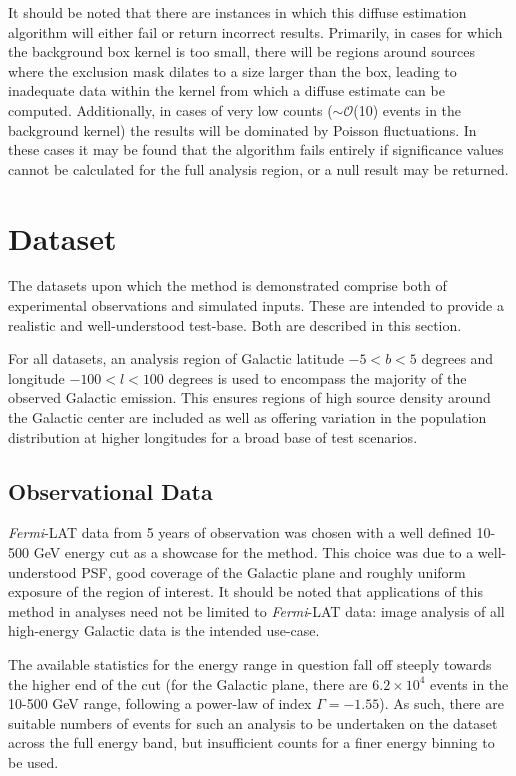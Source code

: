 \documentclass{PoS}
\begin{document}
It should be noted that there are instances in which this diffuse estimation algorithm will either fail or return incorrect results. Primarily, in cases for which the background box kernel is too small, there will be regions around sources where the exclusion mask dilates to a size larger than the box, leading to inadequate data within the kernel from which a diffuse estimate can be computed. Additionally, in cases of very low counts (\textbf{$\sim\mathcal{O}$}(10) events in the background kernel) the results will be dominated by Poisson fluctuations. In these cases it may be found that the algorithm fails entirely if significance values cannot be calculated for the full analysis region, or a null result may be returned.

\section{Dataset}

The datasets upon which the method is demonstrated comprise both of experimental observations and simulated inputs. These are intended to provide a realistic and well-understood test-base. Both are described in this section.

For all datasets, an analysis region of Galactic latitude $-5 < b < 5$ degrees and longitude $-100 < l < 100$ degrees is used to encompass the majority of the observed Galactic emission. This ensures regions of high source density around the Galactic center are included as well as offering variation in the population distribution at higher longitudes for a broad base of test scenarios.


\subsection{Observational Data}

\textit{Fermi}-LAT data from 5 years of observation was chosen with a well defined 10-500 GeV energy cut as a showcase for the method. This choice was due to a well-understood PSF, good coverage of the Galactic plane and roughly uniform exposure of the region of interest. It should be noted that applications of this method in analyses need not be limited to \textit{Fermi}-LAT data: image analysis of all high-energy Galactic data is the intended use-case.

The available statistics for the energy range in question fall off steeply towards the higher end of the cut (for the Galactic plane, there are $6.2 \times 10^4$ events in the 10-500 GeV range, following a power-law of index $\Gamma = -1.55$). As such, there are suitable numbers of events for such an analysis to be undertaken on the dataset across the full energy band, but insufficient counts for a finer energy binning to be used.
\end{document}
